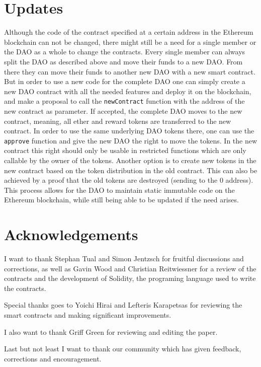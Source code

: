 \documentclass[9pt,oneside]{amsart}
\begin{document}
\begin{multicols}{2}
\section{Updates}
Although the code of the contract specified at a certain address in the Ethereum blockchain can not be changed, there might still be a need for a single member or the DAO as a whole to change the contracts.
Every single member can always split the DAO as described above and move their funds to a new DAO. From there they can move their funds to another new DAO with a new smart contract.
But in order to use a new code for the complete DAO one can simply create a new DAO contract with all the needed features and deploy it on the blockchain, and make a proposal to call the \verb|newContract| function with the address of the new contract as parameter.
If accepted, the complete DAO moves to the new contract, meaning, all ether and reward tokens are transferred to the new contract. In order to use the same underlying DAO tokens there, one can use the \verb|approve| function and give the new DAO the right to move the tokens. In the new contract this right should only be usable in restricted functions which are only callable by the owner of the tokens.
Another option is to create new tokens in the new contract based on the token distribution in the old contract. This can also be achieved by a proof that the old tokens are destroyed (sending to the $0$ address).
This process allows for the DAO to maintain static immutable code on the Ethereum blockchain, while still being able to be updated if the need arises.

\section{Acknowledgements}
I want to thank Stephan Tual and Simon Jentzsch for fruitful discussions and corrections, as well as Gavin Wood and Christian Reitwiessner for a review of the contracts and the development of Solidity, the programing language used to write the contracts.

Special thanks goes to Yoichi Hirai and Lefteris Karapetsas for reviewing the smart contracts and making significant improvements.

I also want to thank Griff Green for reviewing and editing the paper.

Last but not least I want to thank our community which has given feedback, corrections and encouragement.


\end{multicols}
\end{document}
